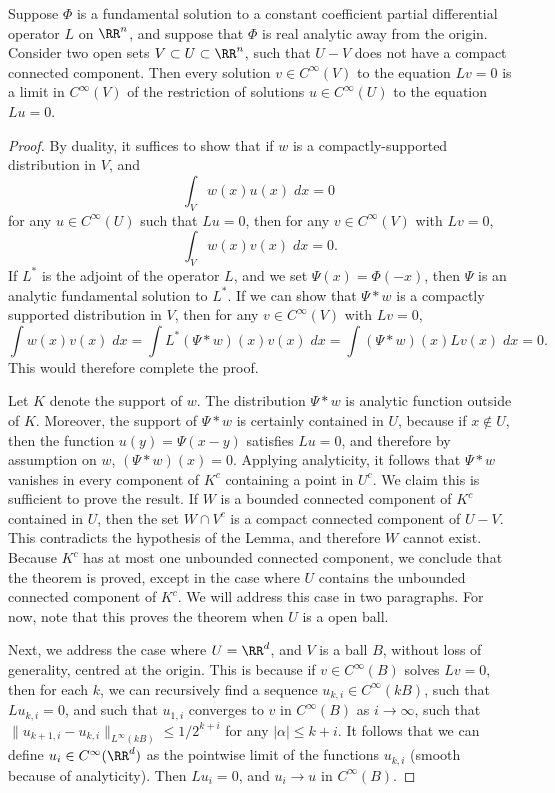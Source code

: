 \begin{lemma}
    Suppose $\Phi$ is a fundamental solution to a constant coefficient partial differential operator $L$ on $\RR^n$, and suppose that $\Phi$ is real analytic away from the origin. Consider two open sets $V \subset U \subset \RR^n$, such that $U - V$ does not have a compact connected component. Then every solution $v \in C^\infty(V)$ to the equation $Lv = 0$ is a limit in $C^\infty(V)$ of the restriction of solutions $u \in C^\infty(U)$ to the equation $Lu = 0$.
\end{lemma}
\begin{proof}
    By duality, it suffices to show that if $w$ is a compactly-supported distribution in $V$, and
    \[ \int_V w(x) u(x)\; dx = 0\ \]
    for any $u \in C^\infty(U)$ such that $Lu = 0$, then for any $v \in C^\infty(V)$ with $Lv = 0$,
    \[ \int_V w(x) v(x)\; dx = 0. \]
    If $L^*$ is the adjoint of the operator $L$, and we set $\Psi(x) = \Phi(-x)$, then $\Psi$ is an analytic fundamental solution to $L^*$. If we can show that $\Psi * w$ is a compactly supported distribution in $V$, then for any $v \in C^\infty(V)$ with $Lv = 0$,
    \[ \int w(x) v(x)\; dx = \int L^* (\Psi * w)(x) v(x)\; dx = \int (\Psi * w)(x) Lv(x)\; dx = 0. \]
    This would therefore complete the proof.

    Let $K$ denote the support of $w$. The distribution $\Psi * w$ is analytic function outside of $K$. Moreover, the support of $\Psi * w$ is certainly contained in $U$, because if $x \not \in U$, then the function $u(y) = \Psi(x-y)$ satisfies $Lu = 0$, and therefore by assumption on $w$, $(\Psi * w)(x) = 0$. Applying analyticity, it follows that $\Psi * w$ vanishes in every component of $K^c$ containing a point in $U^c$. We claim this is sufficient to prove the result. If $W$ is a bounded connected component of $K^c$ contained in $U$, then the set $W \cap V^c$ is a compact connected component of $U - V$. This contradicts the hypothesis of the Lemma, and therefore $W$ cannot exist. Because $K^c$ has at most one unbounded connected component, we conclude that the theorem is proved, except in the case where $U$ contains the unbounded connected component of $K^c$. We will address this case in two paragraphs. For now, note that this proves the theorem when $U$ is a open ball.

    Next, we address the case where $U = \RR^d$, and $V$ is a ball $B$, without loss of generality, centred at the origin. This is because if $v \in C^\infty(B)$ solves $Lv = 0$, then for each $k$, we can recursively find a sequence $u_{k,i} \in C^\infty(k B)$, such that $Lu_{k,i} = 0$, and such that $u_{1,i}$ converges to $v$ in $C^\infty(B)$ as $i \to \infty$, such that $\| u_{k+1,i} - u_{k,i} \|_{L^\infty(k B)} \leq 1/2^{k+i}$ for any $|\alpha| \leq k + i$. It follows that we can define $u_i \in C^\infty(\RR^d)$ as the pointwise limit of the functions $u_{k,i}$ (smooth because of analyticity). Then $Lu_i = 0$, and $u_i \to u$ in $C^\infty(B)$.


\end{proof}
